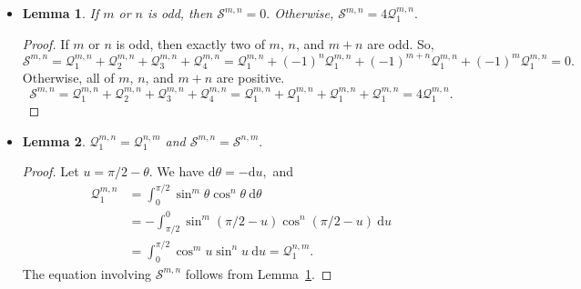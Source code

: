\documentclass[10pt]{article}
\newtheorem{lemma}{Lemma}[section]
\newcommand{\dee}{\mathrm{d}}
\begin{document}
\begin{itemize}
			\item \begin{lemma} \label{s-in-terms-of-q1}
				If $m$ or $n$ is odd, then $\mathcal{S}^{m,n} = 0.$
				Otherwise, $\mathcal{S}^{m,n} = 4\mathcal{Q}_1^{m,n}.$
			\end{lemma}
			\begin{proof}
				If $m$ or $n$ is odd, then exactly two of $m$, $n$, and $m+n$ are odd. 
				So, 
				$$\mathcal{S}^{m,n} 
				= \mathcal{Q}_1^{m,n} + \mathcal{Q}_2^{m,n} + \mathcal{Q}_3^{m,n} + \mathcal{Q}_4^{m,n} 
				= \mathcal{Q}_1^{m,n} + (-1)^n\mathcal{Q}_1^{m,n} 
				+ (-1)^{m+n}\mathcal{Q}_1^{m,n} + (-1)^m\mathcal{Q}_1^{m,n} = 0.$$
				Otherwise, all of $m$, $n$, and $m+n$ are positive.
				$$\mathcal{S}^{m,n} 
				= \mathcal{Q}_1^{m,n} + \mathcal{Q}_2^{m,n} + \mathcal{Q}_3^{m,n} + \mathcal{Q}_4^{m,n} 
				= \mathcal{Q}_1^{m,n} + \mathcal{Q}_1^{m,n} 
				+ \mathcal{Q}_1^{m,n} + \mathcal{Q}_1^{m,n} = 4\mathcal{Q}_1^{m,n}.$$
			\end{proof}			
			
			\item \begin{lemma}
				$\mathcal{Q}_1^{m,n} = \mathcal{Q}_1^{n,m}$ and $\mathcal{S}^{m,n} = \mathcal{S}^{n,m}.$				
			\end{lemma}
			\begin{proof}
				Let $u = \pi/2 - \theta$. We have $\dee \theta = -\dee u,$ and
				\begin{align*}
					\mathcal{Q}_1^{m,n} 
					&= \int_{0}^{\pi/2} \sin^m \theta \cos^n \theta\ \dee\theta\\
					&= -\int_{\pi/2}^{0} \sin^m (\pi/2 - u) \cos^n (\pi/2-u)\ \dee u\\
					&= \int_{0}^{\pi/2} \cos^m u \sin^n u\ \dee u = \mathcal{Q}_1^{n,m}.
				\end{align*}
				The equation involving $\mathcal{S}^{m,n}$ follows from Lemma~\ref{s-in-terms-of-q1}.
			\end{proof}
			

\end{itemize}
\end{document}
